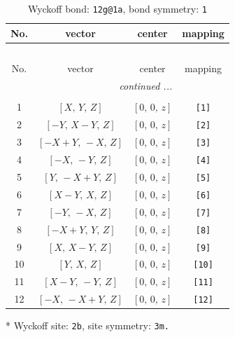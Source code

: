 \documentclass[fleqn,8pt]{jsarticle}
\begin{document}
\begin{longtable}{cccc}
\caption{Wyckoff bond: {\tt 12g@1a}, bond symmetry: {\tt 1}}
 \\
 \hline \hline
No. & vector & center & mapping \\ \hline \endfirsthead

\multicolumn{3}{l}{\tablename\ \thetable{}} \\
 \hline \hline
No. & vector & center & mapping \\ \hline \endhead

 \hline \hline
\multicolumn{3}{r}{\footnotesize\it continued ...} \\ \endfoot

 \hline \hline
\multicolumn{3}{r}{} \\ \endlastfoot

1 & $\left[ X,\, Y,\, Z \right]$ & $\left[ 0,\, 0,\, z \right]$ & {\tt [1]} \\ \hline
2 & $\left[ - Y,\, X - Y,\, Z \right]$ & $\left[ 0,\, 0,\, z \right]$ & {\tt [2]} \\ \hline
3 & $\left[ - X + Y,\, - X,\, Z \right]$ & $\left[ 0,\, 0,\, z \right]$ & {\tt [3]} \\ \hline
4 & $\left[ - X,\, - Y,\, Z \right]$ & $\left[ 0,\, 0,\, z \right]$ & {\tt [4]} \\ \hline
5 & $\left[ Y,\, - X + Y,\, Z \right]$ & $\left[ 0,\, 0,\, z \right]$ & {\tt [5]} \\ \hline
6 & $\left[ X - Y,\, X,\, Z \right]$ & $\left[ 0,\, 0,\, z \right]$ & {\tt [6]} \\ \hline
7 & $\left[ - Y,\, - X,\, Z \right]$ & $\left[ 0,\, 0,\, z \right]$ & {\tt [7]} \\ \hline
8 & $\left[ - X + Y,\, Y,\, Z \right]$ & $\left[ 0,\, 0,\, z \right]$ & {\tt [8]} \\ \hline
9 & $\left[ X,\, X - Y,\, Z \right]$ & $\left[ 0,\, 0,\, z \right]$ & {\tt [9]} \\ \hline
10 & $\left[ Y,\, X,\, Z \right]$ & $\left[ 0,\, 0,\, z \right]$ & {\tt [10]} \\ \hline
11 & $\left[ X - Y,\, - Y,\, Z \right]$ & $\left[ 0,\, 0,\, z \right]$ & {\tt [11]} \\ \hline
12 & $\left[ - X,\, - X + Y,\, Z \right]$ & $\left[ 0,\, 0,\, z \right]$ & {\tt [12]} \\
\end{longtable}
* Wyckoff site: {\tt 2b}, site symmetry: {\tt 3m.}
\renewcommand{\arraystretch}{1.2}
\end{document}
